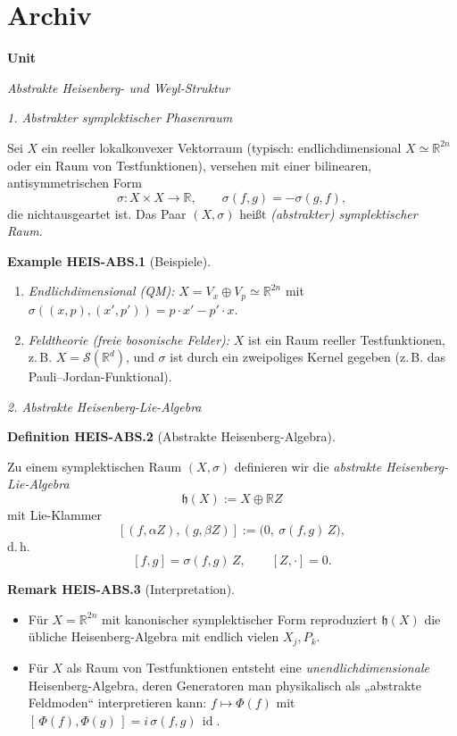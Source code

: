 \documentclass[10pt, letterpaper]{article}
\newcommand{\id}{\operatorname{id}}
\newcommand{\R}{\mathbb{R}}
\newcommand{\CustomHeading}[3]{%
  \par\medskip\noindent%
  \textbf{#1 #2} \textnormal{(#3)}.\enskip%
}
\newenvironment{DEF}[2]{\begin{unitbox}\CustomHeading{Definition}{#1}{#2}}{\end{unitbox}}
\newenvironment{REM}[2]{\begin{unitbox}\CustomHeading{Remark}{#1}{#2}}{\end{unitbox}}
\newenvironment{EXA}[2]{\begin{unitbox}\CustomHeading{Example}{#1}{#2}}{\end{unitbox}}
\newenvironment{unit}[1]
  {\begin{unitbox}\textbf{Unit #1}\par\smallskip}
  {\end{unitbox}}
\begin{document}
\section{Archiv}

\begin{unit}{}
\emph{Abstrakte Heisenberg- und Weyl-Struktur}

\emph{1. Abstrakter symplektischer Phasenraum}

Sei \(X\) ein reeller lokalkonvexer Vektorraum (typisch: endlichdimensional
\(X\simeq\R^{2n}\) oder ein Raum von Testfunktionen), versehen mit einer
bilinearen, antisymmetrischen Form
\[
\sigma : X\times X \longrightarrow \R,
\qquad \sigma(f,g) = -\sigma(g,f),
\]
die nichtausgeartet ist. Das Paar \((X,\sigma)\) heißt \emph{(abstrakter) symplektischer Raum}.

\begin{EXA}{HEIS-ABS.1}{Beispiele}
\begin{enumerate}
\item \emph{Endlichdimensional (QM):}
      \(X = V_x\oplus V_p\simeq\R^{2n}\) mit
      \(\sigma((x,p),(x',p')) = p\cdot x' - p'\cdot x\).
\item \emph{Feldtheorie (freie bosonische Felder):}
      \(X\) ist ein Raum reeller Testfunktionen,
      z.\,B. \(X=\mathcal{S}(\R^d)\),
      und \(\sigma\) ist durch ein zweipoliges Kernel gegeben
      (z.\,B. das Pauli--Jordan-Funktional).
\end{enumerate}
\end{EXA}

\emph{2. Abstrakte Heisenberg-Lie-Algebra}

\begin{DEF}{HEIS-ABS.2}{Abstrakte Heisenberg-Algebra}
Zu einem symplektischen Raum \((X,\sigma)\) definieren wir die
\emph{abstrakte Heisenberg-Lie-Algebra}
\[
\mathfrak{h}(X) := X \oplus \R Z
\]
mit Lie-Klammer
\[
[(f,\alpha Z),(g,\beta Z)]
:= \bigl(0,\ \sigma(f,g)\,Z\bigr),
\]
d.\,h.
\[
[f,g] = \sigma(f,g)\,Z,\qquad [Z,\cdot]=0.
\]
\end{DEF}

\begin{REM}{HEIS-ABS.3}{Interpretation}
\begin{itemize}
\item Für \(X=\R^{2n}\) mit kanonischer symplektischer Form
      reproduziert \(\mathfrak{h}(X)\) die übliche Heisenberg-Algebra
      mit endlich vielen \(X_j,P_k\).
\item Für \(X\) als Raum von Testfunktionen entsteht eine
      \emph{unendlichdimensionale} Heisenberg-Algebra, deren Generatoren
      man physikalisch als „abstrakte Feldmoden“ interpretieren kann:
      \(f\mapsto \Phi(f)\) mit
      \([\,\Phi(f),\Phi(g)\,]= i\,\sigma(f,g)\,\id\).
\end{itemize}
\end{REM}


\end{unit}
\end{document}
